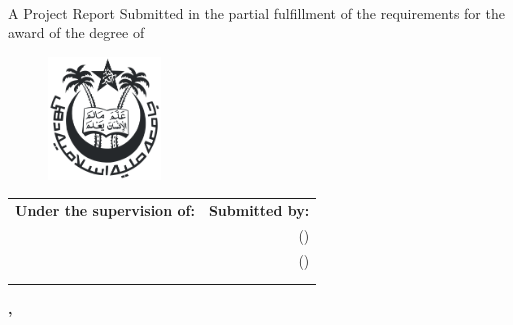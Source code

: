 \begin{titlepage}
    \begin{center}
        \begin{chaptersize}
            \textbf{\projectTitle{}}\\[\baselineskip]
        \end{chaptersize}
        \begin{sectionsize}
            A Project Report\linebreak
            Submitted in the partial fulfillment of the requirements for the
            award of the degree of\\[\baselineskip]
        \end{sectionsize}
        \begin{chaptersize}
            \textbf{\degreeName{}}
        \end{chaptersize}

        \vspace{30mm}
        \begin{figure}[H]
            \centering
            \includegraphics[width=30mm]{img/jmi.png}
        \end{figure}
        \vspace{30mm}

        \begin{sectionsize}
            \begin{center}
                \begin{tabularx}{\textwidth}{L R}
                    \textbf{Under the supervision of:} & \textbf{Submitted by:}\\
                    \mentorName{}                      & \authorAshhar{} (\authorAshharRoll{})\\
                    \mentorJobTitle{}                  & \authorAdeela{} (\authorAdeelaRoll{})\\
                     \\
                    \collegeName{}
                \end{tabularx}
            \end{center}

            \null\vfill

            \textbf{%
                \departmentName{}\linebreak
                \facultyName{}\linebreak
                \collegeName{}, \cityNamePin{}
            }
        \end{sectionsize}
    \end{center}
\end{titlepage}
